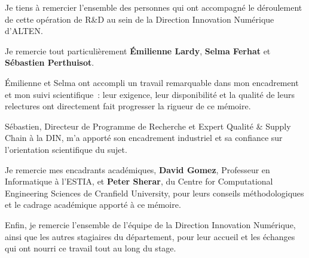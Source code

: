 Je tiens à remercier l'ensemble des personnes qui ont accompagné le déroulement de cette opération de R\&D au sein de la Direction Innovation Numérique d'ALTEN.

Je remercie tout particulièrement \textbf{Émilienne Lardy}, \textbf{Selma Ferhat} et \textbf{Sébastien Perthuisot}. 

Émilienne et Selma ont accompli un travail remarquable dans mon encadrement et mon suivi scientifique~: leur exigence, leur disponibilité et la qualité de leurs relectures ont directement fait progresser la rigueur de ce mémoire. 

Sébastien, Directeur de Programme de Recherche et Expert Qualité \& Supply Chain à la DIN, m'a apporté son encadrement industriel et sa confiance sur l'orientation scientifique du sujet.

Je remercie mes encadrants académiques, \textbf{David Gomez}, Professeur en Informatique à l'ESTIA, et \textbf{Peter Sherar}, du Centre for Computational Engineering Sciences de Cranfield University, pour leurs conseils méthodologiques et le cadrage académique apporté à ce mémoire.

Enfin, je remercie l'ensemble de l'équipe de la Direction Innovation Numérique, ainsi que les autres stagiaires du département, pour leur accueil et les échanges qui ont nourri ce travail tout au long du stage.
